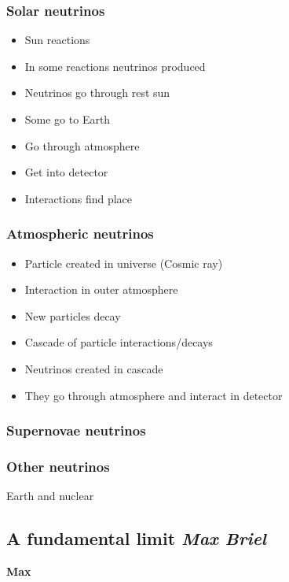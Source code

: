 \documentclass{article}
\begin{document}
\subsubsection{Solar neutrinos}
\begin{itemize}
    \item Sun reactions
    \item In some reactions neutrinos produced
    \item Neutrinos go through rest sun
    \item Some go to Earth
    \item Go through atmosphere
    \item Get into detector
    \item Interactions find place
\end{itemize}

\subsubsection{Atmospheric neutrinos}
\begin{itemize}
    \item Particle created in universe (Cosmic ray)
    \item Interaction in outer atmosphere
    \item New particles decay
    \item Cascade of particle interactions/decays
    \item Neutrinos created in cascade
    \item They go through atmosphere and interact in detector
\end{itemize}

\subsubsection{Supernovae neutrinos}

\subsubsection{Other neutrinos}
Earth and nuclear

\subsection{A fundamental limit \small{\textit{Max Briel}}}
\textbf{Max}
\end{document}
